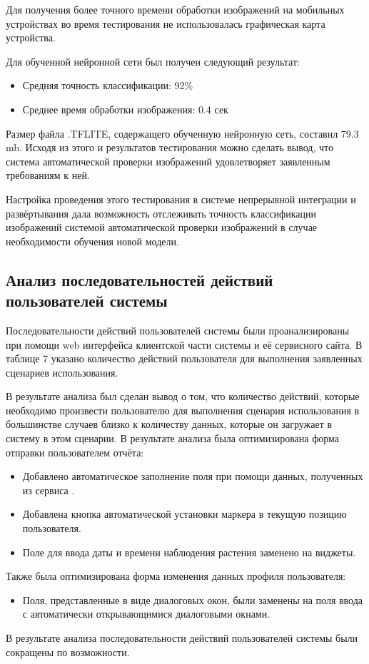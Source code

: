 \tab
Для получения более точного времени обработки изображений на мобильных устройствах во время тестирования не использовалась графическая карта устройства.

\tab
Для обученной нейронной сети был получен следующий результат:
\begin{itemize}
	\item Средняя точность классификации: 92\%
	\item Среднее время обработки изображения: 0.4 сек
\end{itemize}

\tab
Размер файла .TFLITE, содержащего обученную нейронную сеть, составил 79.3 mb.
Исходя из этого и результатов тестирования можно сделать вывод, что система автоматической проверки изображений удовлетворяет заявленным требованиям к ней.

\tab
Настройка проведения этого тестирования в системе непрерывной интеграции и развёртывания дала возможность отслеживать точность классификации изображений системой автоматической проверки изображений в случае необходимости обучения новой модели.

\subsection{Анализ последовательностей действий пользователей системы}

\tab
Последовательности действий пользователей системы были проанализированы при помощи web интерфейса клиентской части системы и её сервисного сайта.
В таблице 7 указано количество действий пользователя для выполнения заявленных сценариев использования.
\tableseven

\tab
В результате анализа был сделан вывод о том, что количество действий, которые необходимо произвести пользователю для выполнения сценария использования в большинстве случаев близко к количеству данных, которые он загружает в систему в этом сценарии.
В результате анализа была оптимизирована форма отправки пользователем отчёта:
\begin{itemize}
	\item Добавлено автоматическое заполнение поля  при помощи данных, полученных из сервиса .
	\item Добавлена кнопка автоматической установки маркера в текущую позицию пользователя.
	\item Поле для ввода даты и времени наблюдения растения заменено на виджеты.
\end{itemize}
Также была оптимизирована форма изменения данных профиля пользователя:
\begin{itemize}
	\item Поля, представленные в виде диалоговых окон, были заменены на поля ввода с автоматически открывающимися диалоговыми окнами.
\end{itemize}

\tab
В результате анализа последовательности действий пользователей системы были сокращены по возможности.
